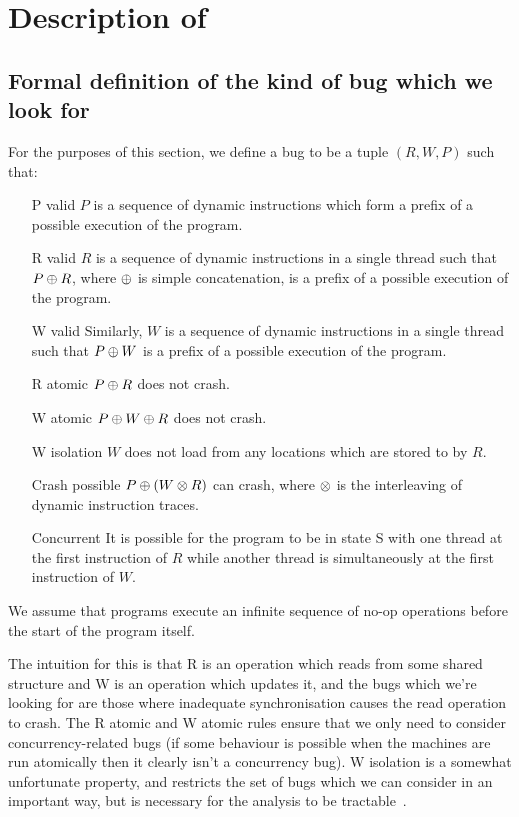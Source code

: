 \section{Description of \StateMachines}

\subsection{Formal definition of the kind of bug which we look for}
\label{sect:finding_bugs:finding_candidate_bugs:formal_definition}
For the purposes of this section, we define a bug to be a tuple $(R, W, P)$ such that:

\begin{itemize}
\item[P valid] $P$ is a sequence of dynamic instructions which form a prefix of a possible execution of the program.
\item[R valid] $R$ is a sequence of dynamic instructions in a single thread such that $P \oplus R$, where $\oplus$ is simple concatenation, is a prefix of a possible execution of the program.
\item[W valid] Similarly, $W$ is a sequence of dynamic instructions in a single thread such that $P \oplus W$ is a prefix of a possible execution of the program.
\item[R atomic] $P \oplus R$ does not crash.
\item[W atomic] $P \oplus W \oplus R$ does not crash.
\item[W isolation] $W$ does not load from any locations which are stored to by $R$.
\item[Crash possible] $P \oplus (W \otimes R)$ can crash, where $\otimes$ is the interleaving of dynamic instruction traces.
\item[Concurrent] It is possible for the program to be in state S with one thread at the first instruction of $R$ while another thread is simultaneously at the first instruction of $W$.
\end{itemize}

We assume that programs execute an infinite sequence of no-op operations before the start of the program itself.

The intuition for this is that R is an operation which reads from some
shared structure and W is an operation which updates it, and the bugs
which we're looking for are those where inadequate synchronisation
causes the read operation to crash.  The R atomic and W atomic rules
ensure that we only need to consider concurrency-related bugs (if some
behaviour is possible when the machines are run atomically then it
clearly isn't a concurrency bug).  W isolation is a somewhat
unfortunate property, and restricts the set of bugs which we can
consider in an important way, but is necessary for the analysis to be
tractable~\needCite{}.

